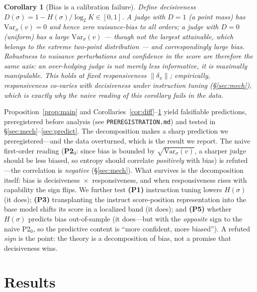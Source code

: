 \documentclass[11pt]{article}
\newtheorem{corollary}{Corollary}
\begin{document}
\begin{corollary}[Bias is a calibration failure]\label{cor:calib}
Define decisiveness $D(\sigma)=1-H(\sigma)/\log_2 K\in[0,1]$. A judge with $D=1$ (a point
mass) has $\mathrm{Var}_\sigma(v)=0$ and hence zero nuisance-bias to all orders; a judge
with $D=0$ (uniform) has a large $\mathrm{Var}_\sigma(v)$ --- though not the largest
attainable, which belongs to the extreme two-point distribution --- and correspondingly
large bias.
Robustness to nuisance perturbations and confidence in the score are therefore the same
axis: an over-hedging judge is not merely less informative, it is maximally
manipulable. This holds \emph{at fixed responsiveness} $\|\delta_\pi\|$; empirically,
responsiveness co-varies with decisiveness under instruction tuning
(\S\ref{sec:mech}), which is exactly why the naive reading of this corollary fails in
the data.
\end{corollary}

\medskip
Proposition~\ref{prop:main} and Corollaries~\ref{cor:diff}--\ref{cor:calib} yield
falsifiable predictions, preregistered before
analysis (see \texttt{PREREGISTRATION.md}) and tested in \S\ref{sec:mech}--\ref{sec:predict}.
The decomposition makes a sharp prediction we preregistered---and the data overturned,
which is the result we report. The naive first-order reading (\textbf{P2$_0$}: since bias
is bounded by $\sqrt{\mathrm{Var}_\sigma(v)}$, a sharper judge should be less biased, so
entropy should correlate \emph{positively} with bias) is refuted---the correlation is
\emph{negative} (\S\ref{sec:mech}). What survives is the decomposition itself: bias is
decisiveness~$\times$~responsiveness, and when responsiveness rises with capability the
sign flips. We further test \textbf{(P1)} instruction tuning lowers $H(\sigma)$ (it
does); \textbf{(P3)} transplanting the instruct score-position representation into the
base model shifts its score in a localized band (it does); and \textbf{(P5)} whether
$H(\sigma)$ predicts bias out-of-sample (it does---but with the \emph{opposite} sign to
the naive P2$_0$, so the predictive content is ``more confident, more biased''). A
refuted \emph{sign} is the point: the theory is a decomposition of bias, not a promise
that decisiveness wins.

\section{Results}
\end{document}

